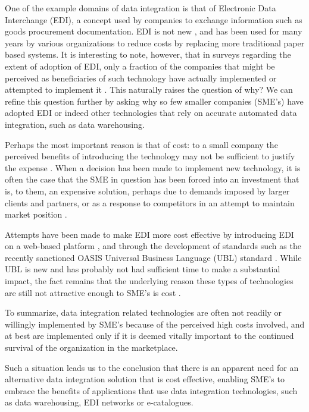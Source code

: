 \documentclass{CRPITStyle}
\begin{document}
One of the example domains of data integration is that of Electronic
Data Interchange (EDI), a concept used by companies to exchange
information such as goods procurement documentation. EDI is not new
\cite{Beck-R-2002-Bled,Medj-B-2003-VLDB}, and has been used for many
years by various organizations to reduce costs by replacing more
traditional paper based systems. It is interesting to note, however,
that in surveys regarding the extent of adoption of EDI, only a fraction
of the companies that might be perceived as beneficiaries of such
technology have actually implemented or attempted to implement it
\cite{Beck-R-2002-Bled,vaHe-E-1999-EDI}. This naturally raises the
question of why? We can refine this question further by asking why so
few smaller companies (SME's) have adopted EDI or indeed other
technologies that rely on accurate automated data integration, such as
data warehousing.

Perhaps the most important reason is that of cost: to a small company
the perceived benefits of introducing the technology may not be
sufficient to justify the expense
\cite{Beck-R-2002-Bled,Guo-J-2003-DocEng,Somm-RA-2002-SIGMOD}. When a
decision has been made to implement new technology, it is often the case
that the SME in question has been forced into an investment that is, to
them, an expensive solution, perhaps due to demands imposed by larger
clients and partners, or as a response to competitors in an attempt to
maintain market position \cite{Beck-R-2002-Bled,vaHe-E-1999-EDI}.

Attempts have been made to make EDI more cost effective by introducing
EDI on a web-based platform \cite{Beck-R-2002-Bled}, and through the
development of standards such as the recently sanctioned OASIS Universal
Business Language (UBL) standard \cite{Mead-B-2004-UBL}. While UBL is
new and has probably not had sufficient time to make a substantial
impact, the fact remains that the underlying reason these types of
technologies are still not attractive enough to SME's is cost
\cite{Beck-R-2002-Bled,Guo-J-2003-DocEng,Somm-RA-2002-SIGMOD,vaHe-E-1999-EDI}.

To summarize, data integration related technologies are often not
readily or willingly implemented by SME's because of the perceived high
costs involved, and at best are implemented only if it is deemed vitally
important to the continued survival of the organization in the
marketplace.

Such a situation leads us to the conclusion that there is an apparent
need for an alternative data integration solution that is cost
effective, enabling SME's to embrace the benefits of applications that
use data integration technologies, such as data warehousing, EDI
networks or e-catalogues.
\end{document}
